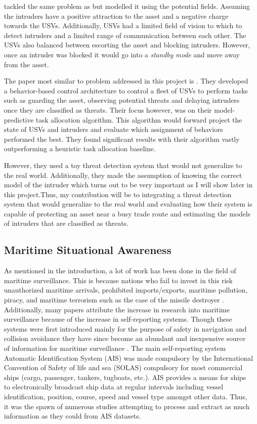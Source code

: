 \documentclass[bsc,frontabs,twoside,singlespacing,parskip,deptreport]{infthesis}     %
\begin{document}
\cite{moundegue2017fields} tackled the same problem as \cite{gupta2015block} but modelled it using the potential fields. Assuming the intruders have a positive attraction to the asset and a negative charge towards the USVs. Additionally, USVs had a limited field of vision to which to detect intruders and a limited range of communication between each other. The USVs also balanced between escorting the asset and blocking intruders. However, once an intruder was blocked it would go into a \emph{standby mode} and move away from the asset.

The paper most similar to problem addressed in this project is \cite{raboin2013model}. They developed a behavior-based control architecture to control a fleet of USVs to perform tasks such as guarding the asset, observing potential threats and delaying intruders once they are classified as threats. Their focus however, was on their model-predictive task allocation algorithm. This algorithm would forward project the state of USVs and intruders and evaluate which assignment of behaviors performed the best. They found significant results with their algorithm vastly outperforming a heuristic task allocation baseline. 

However, they used a toy threat detection system that would not generalize to the real world. Additionally, they made the assumption of knowing the correct model of the intruder which turns out to be very important as I will show later in this project.Thus, my contribution will be to integrating a threat detection system that would generalize to the real world and evaluating how their system is capable of protecting an asset near a busy trade route and estimating the models of intruders that are classified as threats.

\subsection{Maritime Situational Awareness}
As mentioned in the introduction, a lot of work has been done in the field of maritime surveillance. This is because nations who fail to invest in this risk unauthorized maritime arrivals, prohibited imports/exports, maritime pollution, piracy, and maritime terrorism \cite{ristic2008statistical} such as the case of the missile destroyer \cite{combs2009encyclopedia}. Additionally, many papers attribute the increase in research into maritime surveillance because of the increase in self-reporting systems. Though these systems were first introduced mainly for the purpose of safety in navigation and collision avoidance they have since become an abundant and inexpensive source of information for maritime surveillance  \cite{kde}. The main self-reporting system Automatic Identification System (AIS) was made compulsory by the International Convention of Safety of life and sea (SOLAS) compulsory for most commercial ships (cargo, passenger, tankers, tugboats, etc.). AIS provides a means for ships to electronically broadcast ship data at regular intervals including vessel identification, position, course, speed and vessel type amongst other data. Thus, it was the spawn of numerous studies attempting to process and extract as much information as they could from AIS datasets. 
\end{document}
